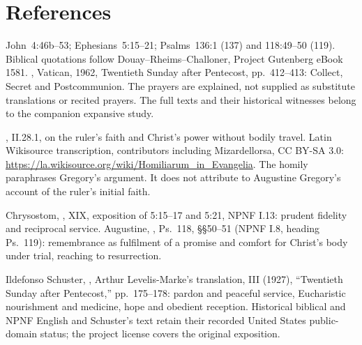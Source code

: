 \section{References}
\begin{description}[style=nextline,leftmargin=0pt,labelsep=0pt,itemsep=.35em]
\item[Appointed Scripture and prayers]
John~4:46b--53; Ephesians~5:15--21; Psalms~136:1 (137) and
118:49--50 (119). Biblical quotations follow Douay--Rheims--Challoner,
Project Gutenberg eBook 1581. , Vatican, 1962,
Twentieth Sunday after Pentecost, pp.~412--413: Collect, Secret and
Postcommunion. The prayers are explained, not supplied as substitute
translations or recited prayers. The full texts and their historical
witnesses belong to the companion expansive study.

\item[Gregory the Great]
, II.28.1, on the ruler's faith and
Christ's power without bodily travel. Latin Wikisource transcription,
contributors including Mizardellorsa, CC BY-SA 3.0:
\url{https://la.wikisource.org/wiki/Homiliarum_in_Evangelia}.
The homily paraphrases Gregory's argument. It does not attribute to
Augustine Gregory's account of the ruler's initial faith.

\item[John Chrysostom and Augustine]
Chrysostom, , XIX, exposition of 5:15--17
and 5:21, NPNF I.13: prudent fidelity and reciprocal service.
Augustine, , Ps.~118, \S\S50--51
(NPNF I.8, heading Ps.~119): remembrance as fulfilment of a promise
and comfort for Christ's body under trial, reaching to resurrection.

\item[Liturgical reception]
Ildefonso Schuster, , Arthur Levelis-Marke's
translation, III (1927), ``Twentieth Sunday after Pentecost,''
pp.~175--178: pardon and peaceful service, Eucharistic nourishment
and medicine, hope and obedient reception. Historical biblical and
NPNF English and Schuster's text retain their recorded United States
public-domain status; the project license covers the original exposition.
\end{description}
